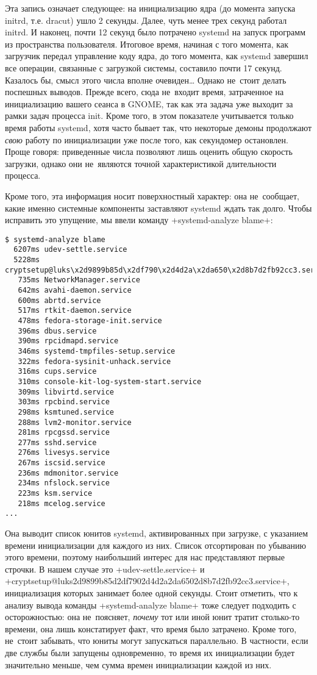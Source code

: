 \documentclass[10pt,oneside,a4paper]{article}
\begin{document}
Эта запись означает следующее: на инициализацию ядра (до момента запуска initrd,
т.е. dracut) ушло 2 секунды. Далее, чуть менее трех секунд работал initrd. И
наконец, почти 12 секунд было потрачено systemd на запуск программ из
пространства пользователя. Итоговое время, начиная с того момента, как загрузчик
передал управление коду ядра, до того момента, как systemd завершил все
операции, связанные с загрузкой системы, составило почти 17 секунд.  Казалось
бы, смысл этого числа вполне очевиден\ldots{} Однако не~стоит делать поспешных
выводов. Прежде всего, сюда не~входит время, затраченное на
инициализацию вашего сеанса в GNOME, так как эта задача уже выходит за рамки
задач процесса init. Кроме того, в этом показателе учитывается только время
работы systemd, хотя часто бывает так, что некоторые демоны продолжают
\emph{свою} работу по инициализации уже после того, как секундомер остановлен.
Проще говоря: приведенные числа позволяют лишь оценить общую скорость
загрузки, однако они не~являются точной характеристикой длительности процесса.

Кроме того, эта информация носит поверхностный характер: она не~сообщает, какие
именно системные компоненты заставляют systemd ждать так долго. Чтобы исправить 
это упущение, мы ввели команду +systemd-analyze blame+:
\begin{Verbatim}
$ systemd-analyze blame
  6207ms udev-settle.service
  5228ms cryptsetup@luks\x2d9899b85d\x2df790\x2d4d2a\x2da650\x2d8b7d2fb92cc3.service
   735ms NetworkManager.service
   642ms avahi-daemon.service
   600ms abrtd.service
   517ms rtkit-daemon.service
   478ms fedora-storage-init.service
   396ms dbus.service
   390ms rpcidmapd.service
   346ms systemd-tmpfiles-setup.service
   322ms fedora-sysinit-unhack.service
   316ms cups.service
   310ms console-kit-log-system-start.service
   309ms libvirtd.service
   303ms rpcbind.service
   298ms ksmtuned.service
   288ms lvm2-monitor.service
   281ms rpcgssd.service
   277ms sshd.service
   276ms livesys.service
   267ms iscsid.service
   236ms mdmonitor.service
   234ms nfslock.service
   223ms ksm.service
   218ms mcelog.service
...
\end{Verbatim}

Она выводит список юнитов systemd, активированных при загрузке, с указанием
времени инициализации для каждого из них. Список отсортирован по убыванию этого
времени, поэтому наибольший интерес для нас представляют первые строчки. В нашем
случае это +udev-settle.service+ и
+cryptsetup@luks\x2d9899b85d\x2df790\x2d4d2a\x2da650\x2d8b7d2fb92cc3.service+,
инициализация которых занимает более одной секунды. Стоит отметить, что к
анализу вывода команды +systemd-analyze blame+ тоже следует подходить с
осторожностью: она не~поясняет, \emph{почему} тот или иной юнит тратит
столько-то времени, она лишь констатирует факт, что время было затрачено. Кроме
того, не~стоит забывать, что юниты могут запускаться параллельно. В частности,
если две службы были запущены одновременно, то время их инициализации будет
значительно меньше, чем сумма времен инициализации каждой из них.
\end{document}
